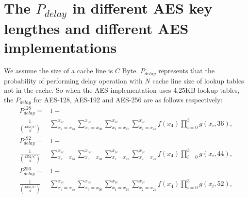 \section{The $P_{delay}$ in different AES key lengthes and different AES implementations }
\label{appendixb}
We assume the size of a cache line is $C$ Byte. $P_{delay}$ represents that the probability of performing delay operation with $N$ cache line size of lookup tables not in the cache. So when the AES implementation uses 4.25KB lookup tables, the $P_{delay}$ for AES-128, AES-192 and AES-256 are as follows respectively:
\begin{align}
    P_{delay}^{128} = &1-   \nonumber \\
    \frac{1}{\binom{4352/C}{N}}&\sum_{x_4=x_{4b}}^{x_{4e}}{\sum_{x_0=x_{0b}}^{x_{0e}}{\sum_{x_1=x_{1b}}^{x_{1e}}{ \sum_{x_2=x_{2b}}^{x_{2e}}{f(x_4)\prod_{i=0}^{3}{g(x_i,36)}}}}}, \nonumber
\end{align}
\begin{align}
    P_{delay}^{192} = &1-  \nonumber \\
    \frac{1}{\binom{4352/C}{N}}&\sum_{x_4=x_{4b}}^{x_{4e}}{\sum_{x_0=x_{0b}}^{x_{0e}}{\sum_{x_1=x_{1b}}^{x_{1e}}{ \sum_{x_2=x_{2b}}^{x_{2e}}{f(x_4)\prod_{i=0}^{3}{g(x_i,44)}}}}}, \nonumber
\end{align}
\begin{align}
    P_{delay}^{256} = &1-  \nonumber \\
    \frac{1}{\binom{4352/C}{N}}&\sum_{x_4=x_{4b}}^{x_{4e}}{\sum_{x_0=x_{0b}}^{x_{0e}}{\sum_{x_1=x_{1b}}^{x_{1e}}{ \sum_{x_2=x_{2b}}^{x_{2e}}{f(x_4)\prod_{i=0}^{3}{g(x_i,52)}}}}}, \nonumber
\end{align}

